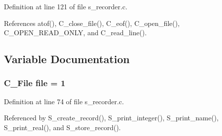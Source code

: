 Definition at line 121 of file s\_\-recorder.c.

References atof(), C\_\-close\_\-file(), C\_\-eof(), C\_\-open\_\-file(), C\_\-OPEN\_\-READ\_\-ONLY, and C\_\-read\_\-line().

\subsection{Variable Documentation}
\subsubsection{\setlength{\rightskip}{0pt plus 5cm}\bf{C\_\-File} \bf{file} = 1\hspace{0.3cm}{\tt  [static]}}\label{s__recorder_8c_180168cca143b6174b97edf897d8f216}




Definition at line 74 of file s\_\-recorder.c.

Referenced by S\_\-create\_\-record(), S\_\-print\_\-integer(), S\_\-print\_\-name(), S\_\-print\_\-real(), and S\_\-store\_\-record().